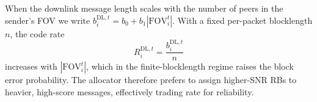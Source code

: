 \documentclass[conference]{IEEEtran}
\begin{document}
When the downlink message length scales with the number of peers in the
sender's FOV we write
$b_i^{\mathrm{DL},t}=b_0+b_1|\mathrm{FOV}_i^t|$.
With a fixed per-packet blocklength $n$, the code rate
\begin{equation}
R_i^{\mathrm{DL},t}=\frac{b_i^{\mathrm{DL},t}}{n}
\end{equation}
increases with $|\mathrm{FOV}_i^t|$, which in the finite-blocklength regime
raises the block error probability.
The allocator therefore prefers to assign higher-SNR RBs to heavier, high-score
messages, effectively trading rate for reliability.






\end{document}

